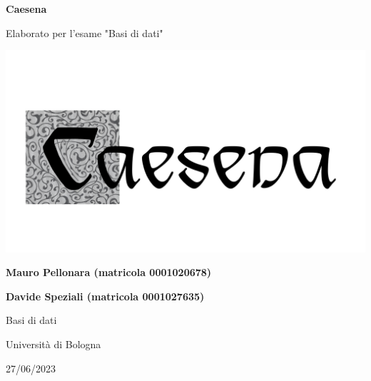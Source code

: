 \documentclass[italian, a4paper, 12pt]{article}
\begin{document}
\begin{titlepage}
    \begin{center}
        \vspace*{1cm}

        \textbf{\Huge Caesena}

        \vspace{1cm}

        {\LARGE Elaborato per l'esame "Basi di dati"}

        \vfill

        {\includegraphics[scale=.6]{images/caesena.png}}

        \vfill

        \textbf{\Large Mauro Pellonara (matricola 0001020678)}

        \vspace{0.01cm}

        \textbf{\Large Davide Speziali (matricola 0001027635)}

        \vspace{1cm}

        {\large Basi di dati}

        \vspace{0.3cm}

        {\large Università di Bologna}

        \vspace{0.3cm}

        {\large 27/06/2023}
    \end{center}
\end{titlepage}

\tableofcontents
\newpage


\clearpage

\clearpage

\clearpage

\clearpage

\end{document}
